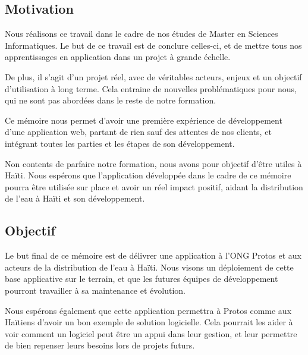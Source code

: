 \documentclass{EPL-master-thesis-covers-FR}
\begin{document}
		\subsection*{Motivation}

			Nous réalisons ce travail dans le cadre de nos études de Master en Sciences Informatiques. Le but de ce travail est de conclure celles-ci, et de mettre tous nos apprentissages en application dans un projet à grande échelle.

			De plus, il s'agit d'un projet réel, avec de véritables acteurs, enjeux et un objectif d'utilisation à long terme. Cela entraine de nouvelles problématiques pour nous, qui ne sont pas abordées dans le reste de notre formation.

			Ce mémoire nous permet d'avoir une première expérience de développement d'une application web, partant de rien sauf des attentes de nos clients, et intégrant toutes les parties et les étapes de son développement.

			Non contents de parfaire notre formation, nous avons pour objectif d'être utiles à Haïti. Nous espérons que l'application développée dans le cadre de ce mémoire pourra être utilisée sur place et avoir un réel impact positif, aidant la distribution de l'eau à Haïti et son développement.

		\subsection*{Objectif}

			Le but final de ce mémoire est de délivrer une application à l'ONG Protos et aux acteurs de la distribution de l'eau à Haïti. Nous visons un déploiement de cette base applicative sur le terrain, et que les futures équipes de développement pourront travailler à sa maintenance et évolution.

			Nous espérons également que cette application permettra à Protos comme aux Haïtiens d'avoir un bon exemple de solution logicielle. Cela pourrait les aider à voir comment un logiciel peut être un appui dans leur gestion, et leur permettre de bien repenser leurs besoins lors de projets futurs.
\end{document}
